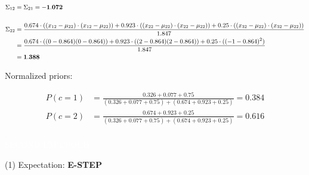 \documentclass[12pt]{article}
\begin{document}
\begin{enumerate}
    \begin{equation*}
        \fontsize{9pt}{10pt}\selectfont
        \begin{aligned}
            \Sigma_{12} &= \Sigma_{21} = \mathbf{-1.072}\\
            \\
            \Sigma_{22} &= \frac{0.674 \cdot ((x_{12}-\mu_{22}) \cdot (x_{12} - \mu_{22}))+ 0.923 \cdot ((x_{22}-\mu_{22}) \cdot (x_{22} - \mu_{22}))+ 0.25 \cdot ((x_{32}-\mu_{22}) \cdot (x_{32} - \mu_{22}))}{1.847}\\
            &=\frac{0.674 \cdot ((0-0.864)(0-0.864)) + 0.923 \cdot ((2-0.864)(2-0.864)) + 0.25 \cdot ((-1-0.864)^2)}{1.847}\\
            &= \mathbf{1.388}\\
        \end{aligned}
    \end{equation*}

    Normalized priors:

    \begin{equation*}
        \begin{aligned}
            P(c=1) &= \frac{0.326+0.077+0.75}{(0.326+0.077+0.75) + (0.674+0.923+0.25)} = 0.384\\
            P(c=2) &= \frac{0.674+0.923+0.25}{(0.326+0.077+0.75) + (0.674+0.923+0.25)} = 0.616\\
        \end{aligned}
    \end{equation*}

    \vspace{20pt}
    \colorbox{codeblue}{\textcolor{white}{SECOND EM EPOCH}}

    \vspace{10pt}
    (1) Expectation: \textbf{\textcolor{codeblue}{E-STEP}}
        
        \vspace{10pt}


\end{enumerate}
\end{document}
